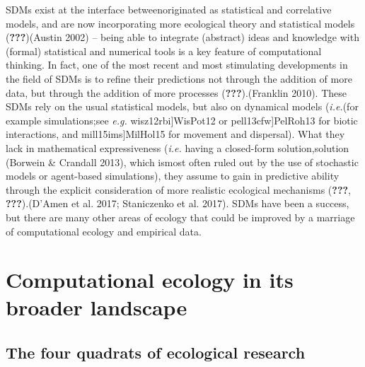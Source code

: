 \documentclass[11pt,serif]{article}
\begin{document}
SDMs \color{gray}exist at the interface
between\color{black}\color{purple}originated as statistical and
correlative models, and are now incorporating\color{black}
\color{purple}more\color{black} ecological theory \color{gray}and
statistical models\color{black}
\color{gray}({\textbf{???}})\color{black}\color{purple}(Austin
2002)\color{black} -- being able to integrate (abstract) ideas and
knowledge with (formal) statistical and numerical tools is a key feature
of computational thinking. In fact, one of the most recent and most
stimulating developments in the field of SDMs is to refine their
predictions not through the addition of more data, but through the
addition of more processes
\color{gray}({\textbf{???}}).\color{black}\color{purple}(Franklin
2010).\color{black} These SDMs rely on the usual statistical models, but
also on dynamical models
\color{gray}(\emph{i.e.}\color{black}\color{purple}(for
example\color{black} simulations;\color{gray}see\color{black}
\emph{e.g.}
\color{gray}{[}wisz12rbi{]}\color{black}\color{purple}WisPot12\color{black}
or
\color{gray}{[}pell13cfw{]}\color{black}\color{purple}PelRoh13\color{black}
for biotic interactions, and
\color{gray}{[}mill15ims{]}\color{black}\color{purple}MilHol15\color{black}
for movement and dispersal). What they lack in mathematical
expressiveness (\emph{i.e.} having a closed-form
\color{gray}solution,\color{black}\color{purple}solution (Borwein \&
Crandall 2013),\color{black} which is\color{gray}most\color{black} often
ruled out by the use of stochastic \color{purple}models or
agent-based\color{black} simulations), they assume to gain in predictive
ability through the explicit consideration of more realistic ecological
mechanisms \color{gray}({\textbf{???}},
{\textbf{???}}).\color{black}\color{purple}(D'Amen et al. 2017;
Staniczenko et al. 2017).\color{black} SDMs have been a success, but
there are many other areas of ecology that could be improved by a
marriage of computational ecology and empirical data.

\section{Computational ecology in its broader
landscape}\label{computational-ecology-in-its-broader-landscape}

\subsection{The four quadrats of ecological
research}\label{the-four-quadrats-of-ecological-research}
\end{document}
